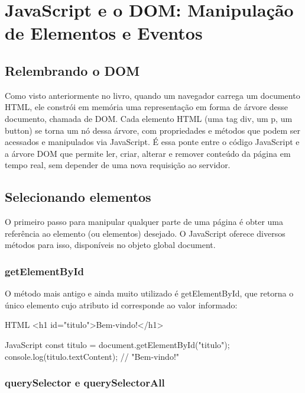 \chapter{JavaScript e o DOM: Manipulação de Elementos e Eventos}

\section{Relembrando o DOM}

Como visto anteriormente no livro, quando um navegador carrega um documento HTML, ele constrói em memória uma representação em forma de árvore desse documento, chamada de DOM. Cada elemento HTML (uma tag div, um p, um button) se torna um nó dessa árvore, com propriedades e métodos que podem ser acessados e manipulados via JavaScript. É essa ponte entre o código JavaScript e a árvore DOM que permite ler, criar, alterar e remover conteúdo da página em tempo real, sem depender de uma nova requisição ao servidor.

\section{Selecionando elementos}

O primeiro passo para manipular qualquer parte de uma página é obter uma referência ao elemento (ou elementos) desejado. O JavaScript oferece diversos métodos para isso, disponíveis no objeto global document.

\subsection{getElementById}

O método mais antigo e ainda muito utilizado é getElementById, que retorna o único elemento cujo atributo id corresponde ao valor informado:

\begin{codebox}{HTML}
 <h1 id="titulo">Bem-vindo!</h1>
\end{codebox}

\begin{codebox}{JavaScript}
 const titulo = document.getElementById("titulo");
 console.log(titulo.textContent); // "Bem-vindo!"
\end{codebox}

\subsection{querySelector e querySelectorAll}

